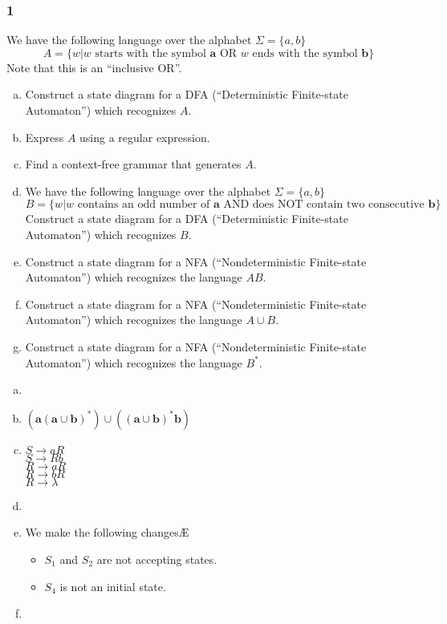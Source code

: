 \documentclass[../main.tex]{subfiles}
\begin{document}
\subsubsection*{1\hfill}
We have the following language over the alphabet $\Sigma = \{a, b\}$
\begin{equation*}
	A = \{w | w \text{ starts with the symbol } \mathbf{a} \text{ OR $w$ ends with the symbol } \mathbf{b}\}
\end{equation*}
Note that this is an ``inclusive OR''.
\begin{enumerate}[a)]
	\item Construct a state diagram for a DFA (``Deterministic Finite-state Automaton'') which recognizes $A$.
	\item Express $A$ using a regular expression.
	\item Find a context-free grammar that generates $A$.
	\item We have the following language over the alphabet $\Sigma = \{a, b\}$
		\begin{equation*}
			B = \{w | w \text{ contains an odd number of } \mathbf{a} \text{ AND does NOT contain two consecutive } \mathbf{b}\}
		\end{equation*}
		Construct a state diagram for a DFA (``Deterministic Finite-state Automaton'') which recognizes $B$.
	\item Construct a state diagram for a NFA (``Nondeterministic Finite-state Automaton'') which recognizes the language $AB$.
	\item Construct a state diagram for a NFA (``Nondeterministic Finite-state Automaton'') which recognizes the language $A \cup B$.
	\item Construct a state diagram for a NFA (``Nondeterministic Finite-state Automaton'') which recognizes the language $B^\ast$.
\end{enumerate}

\solution
\begin{enumerate}[a)]
	\item 
	\item $\mathbf{(a(a \cup b)^\ast) \cup ((a \cup b)^\ast b)}$
	\item 
		$S \rightarrow aR$\\
		$S \rightarrow Rb$\\
		$R \rightarrow aR$\\
		$R \rightarrow bR$\\
		$R \rightarrow \lambda$
	\item 
	\item We make the following changesÆ
		\begin{itemize}
			\item $S_1$ and $S_2$ are not accepting states.
			\item $S_4$ is not an initial state.
		\end{itemize}
	\item 
\end{enumerate}
\end{document}
